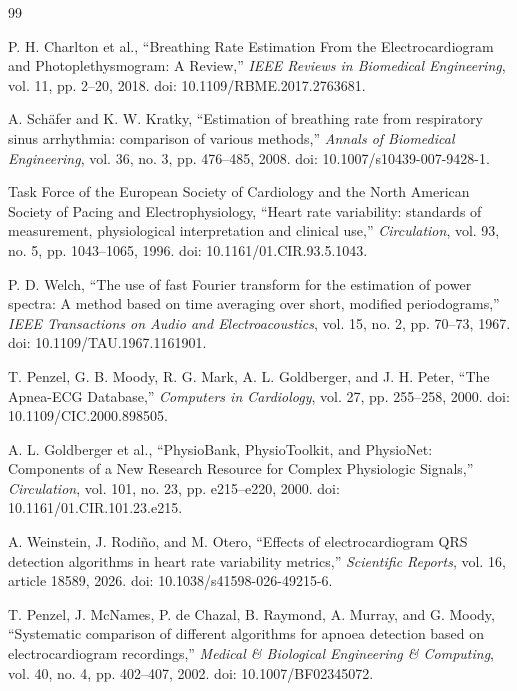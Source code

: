 \begin{thebibliography}{99}

P. H. Charlton et al., ``Breathing Rate Estimation From the Electrocardiogram and Photoplethysmogram: A Review,'' \textit{IEEE Reviews in Biomedical Engineering}, vol. 11, pp. 2--20, 2018. doi: 10.1109/RBME.2017.2763681.

A. Sch\"afer and K. W. Kratky, ``Estimation of breathing rate from respiratory sinus arrhythmia: comparison of various methods,'' \textit{Annals of Biomedical Engineering}, vol. 36, no. 3, pp. 476--485, 2008. doi: 10.1007/s10439-007-9428-1.

Task Force of the European Society of Cardiology and the North American Society of Pacing and Electrophysiology, ``Heart rate variability: standards of measurement, physiological interpretation and clinical use,'' \textit{Circulation}, vol. 93, no. 5, pp. 1043--1065, 1996. doi: 10.1161/01.CIR.93.5.1043.

P. D. Welch, ``The use of fast Fourier transform for the estimation of power spectra: A method based on time averaging over short, modified periodograms,'' \textit{IEEE Transactions on Audio and Electroacoustics}, vol. 15, no. 2, pp. 70--73, 1967. doi: 10.1109/TAU.1967.1161901.

T. Penzel, G. B. Moody, R. G. Mark, A. L. Goldberger, and J. H. Peter, ``The Apnea-ECG Database,'' \textit{Computers in Cardiology}, vol. 27, pp. 255--258, 2000. doi: 10.1109/CIC.2000.898505.

A. L. Goldberger et al., ``PhysioBank, PhysioToolkit, and PhysioNet: Components of a New Research Resource for Complex Physiologic Signals,'' \textit{Circulation}, vol. 101, no. 23, pp. e215--e220, 2000. doi: 10.1161/01.CIR.101.23.e215.

A. Weinstein, J. Rodi\~no, and M. Otero, ``Effects of electrocardiogram QRS detection algorithms in heart rate variability metrics,'' \textit{Scientific Reports}, vol. 16, article 18589, 2026. doi: 10.1038/s41598-026-49215-6.

T. Penzel, J. McNames, P. de Chazal, B. Raymond, A. Murray, and G. Moody, ``Systematic comparison of different algorithms for apnoea detection based on electrocardiogram recordings,'' \textit{Medical \& Biological Engineering \& Computing}, vol. 40, no. 4, pp. 402--407, 2002. doi: 10.1007/BF02345072.


\end{thebibliography}
